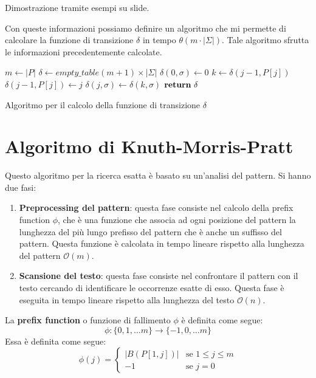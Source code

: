 \begin{nota}
    Dimostrazione tramite esempi su slide.
\end{nota}
Con queste informazioni possiamo definire un algoritmo che mi permette di calcolare
la funzione di transizione $\delta$ in tempo $\theta(m \cdot |\Sigma|)$. Tale
algoritmo sfrutta le informazioni precedentemente calcolate.
\begin{algorithm}[!ht]
    \begin{algorithmic}
        \State $m\gets |P|$
        \State $\delta \gets empty\_table (m + 1) \times | \Sigma|$
        \For{$\sigma \in \Sigma$}
        \State $\delta(0, \sigma) \gets 0$
        \EndFor
        \State $k \gets \delta(j - 1, P[j])$
        \State $\delta(j - 1, P[j]) \gets j$
        \For{$\sigma \in \Sigma$}
        \State $\delta(j, \sigma) \gets \delta(k, \sigma)$
        \EndFor
        \EndFor
        \State $\text{\textbf{return}} \ \delta$
        \EndFunction
    \end{algorithmic}
    \caption{Algoritmo per il calcolo della funzione di transizione $\delta$}
\end{algorithm}
\newpage
\section{Algoritmo di Knuth-Morris-Pratt}
Questo algoritmo per la ricerca esatta è basato su un'analisi del pattern. Si hanno due fasi:
\begin{enumerate}
    \item \textbf{Preprocessing del pattern}: questa fase consiste nel calcolo
          della prefix function $\phi$, che è una funzione che associa ad ogni posizione
          del pattern la lunghezza del più lungo prefisso del pattern che è anche un
          suffisso del pattern. Questa funzione è calcolata in tempo lineare rispetto
          alla lunghezza del pattern $\mathcal{O}(m)$.
    \item \textbf{Scansione del testo}: questa fase consiste nel confrontare il
          pattern con il testo cercando di identificare le occorrenze esatte di esso.
          Questa fase è eseguita in tempo lineare rispetto alla lunghezza del testo $\mathcal{O}(n)$.
\end{enumerate}
La \textbf{prefix function} o funzione di fallimento $\phi$ è definita come segue:
\begin{equation}
    \phi: \{0, 1, \dots m\} \to \{-1, 0, \dots m\}
\end{equation}
Essa è definita come segue:
\begin{equation}
    \phi(j) = \begin{cases} |B(P[1, j])| & \text{se } 1 \leq j \leq m \\-1 & \text{se } j = 0 \end{cases}
\end{equation}

